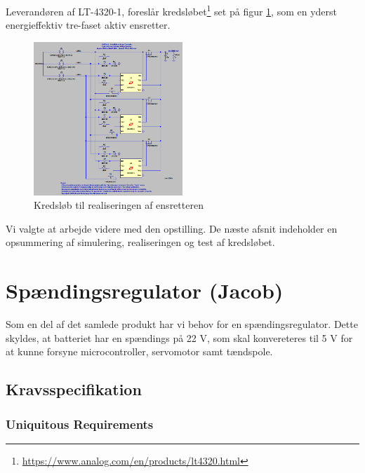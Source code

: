 Leverandøren af LT-4320-1, foreslår kredsløbet\footnote{\url{https://www.analog.com/en/products/lt4320.html}} set på figur \ref{fig:prens2}, som en yderst energieffektiv tre-faset aktiv ensretter.

\begin{figure}[h]
  \centering
  \includegraphics[width=0.5\textwidth]{./figurer/prens4.png}
  \caption{Kredsløb til realiseringen af ensretteren}
  \label{fig:prens2}
\end{figure}

Vi valgte at arbejde videre med den opstilling. De næste afsnit indeholder en opsummering af simulering, realiseringen og test af kredsløbet.

\section{Spændingsregulator (Jacob)}
\label{sec:spandingsforstarker}

Som en del af det samlede produkt har vi behov for en spændingsregulator. Dette skyldes, at batteriet har en spændings på 22 V, som skal konvereteres til 5 V for at kunne forsyne microcontroller, servomotor samt tændspole. %

\subsection{Kravsspecifikation}
\label{sec:kravsspecifikation-2}

\subsubsection{Uniquitous Requirements}
\label{sec:kravsspecifikation-3}

